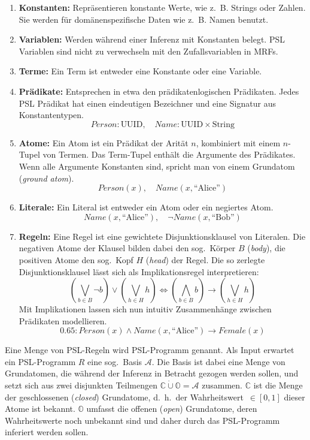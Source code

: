 \begin{enumerate}
	\item \textbf{Konstanten:}
		Repräsentieren konstante Werte, wie z.~B. Strings oder Zahlen.
		Sie werden für domänenspezifische Daten wie z.~B. Namen benutzt.
	\item \textbf{Variablen:}
		Werden während einer Inferenz mit Konstanten belegt.
		PSL Variablen sind nicht zu verwechseln mit den Zufallsvariablen in MRFs.
	\item \textbf{Terme:}
		Ein Term ist entweder eine Konstante oder eine Variable.
	\item \textbf{Prädikate:}
		Entsprechen in etwa den prädikatenlogischen Prädikaten.
		Jedes PSL Prädikat hat einen eindeutigen Bezeichner und eine Signatur aus Konstanten\-typen.
		\[\mathit{Person}: \text{UUID},\quad \mathit{Name}: \text{UUID} \times \text{String}\]
	\item \textbf{Atome:}
		Ein Atom ist ein Prädikat der Arität $n$, kombiniert mit einem $n$-Tupel von Termen.
		Das Term-Tupel enthält die Argumente des Prädikates.
		Wenn alle Argumente Konstanten sind, spricht man von einem Grundatom (\textit{ground atom}). \\
		\[\mathit{Person}(x),\quad \mathit{Name}(x, \text{``Alice''})\] %
	\item \textbf{Literale:}
		Ein Literal ist entweder ein Atom oder ein negiertes Atom. \\
		\[\mathit{Name}(x, \text{``Alice''}),\quad \lnot \mathit{Name}(x, \text{``Bob''})\] %
	\item \textbf{Regeln:}
		Eine Regel ist eine gewichtete Disjunktionsklausel von Literalen.
		Die negativen Atome der Klausel bilden dabei den sog.\ Körper $B$ (\textit{body}), die positiven Atome den sog.\ Kopf $H$ (\textit{head}) der Regel.
		Die so zerlegte Disjunktionsklausel lässt sich als Implikationsregel interpretieren:
		\[
			\left(\bigvee_{b \in B} \lnot b\right) \lor \left(\bigvee_{h \in H} h\right) \Leftrightarrow \left(\bigwedge_{b \in B}  b\right) \rightarrow \left(\bigvee_{h \in H} h\right)
		\]
		Mit Implikationen lassen sich nun intuitiv Zusammenhänge zwischen Prädikaten modellieren.\\
		\[0.65: \mathit{Person}(x) \land \mathit{Name}(x, \text{``Alice''}) \rightarrow Female(x)\] %
\end{enumerate}

Eine Menge von PSL-Regeln wird PSL-Programm genannt.
Als Input erwartet ein PSL-Programm $R$ eine sog.\ Basis $\mathcal{A}$.
Die Basis ist dabei eine Menge von Grundatomen, die während der Inferenz in Betracht gezogen werden sollen, und setzt sich aus zwei disjunkten Teilmengen $\mathbb{C} \mathbin{\dot\cup} \mathbb{O} = \mathcal{A}$ zusammen.
$\mathbb{C}$ ist die Menge der geschlossenen (\textit{closed}) Grundatome, d.~h.\ der Wahrheitswert~$\in [0, 1]$ dieser Atome ist bekannt.
$\mathbb{O}$ umfasst die offenen (\textit{open}) Grundatome, deren Wahrheitswerte noch unbekannt sind und daher durch das PSL-Programm inferiert werden sollen.

